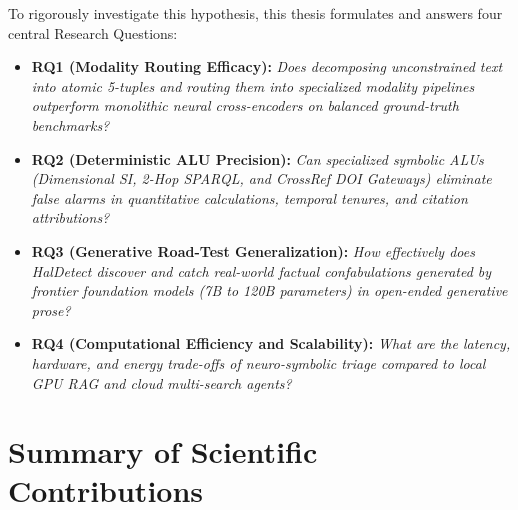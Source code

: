 To rigorously investigate this hypothesis, this thesis formulates and answers four central Research Questions:

\begin{itemize}
    \item \textbf{RQ1 (Modality Routing Efficacy):} \textit{Does decomposing unconstrained text into atomic 5-tuples and routing them into specialized modality pipelines outperform monolithic neural cross-encoders on balanced ground-truth benchmarks?}
    \item \textbf{RQ2 (Deterministic ALU Precision):} \textit{Can specialized symbolic ALUs (Dimensional SI, 2-Hop SPARQL, and CrossRef DOI Gateways) eliminate false alarms in quantitative calculations, temporal tenures, and citation attributions?}
    \item \textbf{RQ3 (Generative Road-Test Generalization):} \textit{How effectively does HalDetect discover and catch real-world factual confabulations generated by frontier foundation models (7B to 120B parameters) in open-ended generative prose?}
    \item \textbf{RQ4 (Computational Efficiency and Scalability):} \textit{What are the latency, hardware, and energy trade-offs of neuro-symbolic triage compared to local GPU RAG and cloud multi-search agents?}
\end{itemize}

\section{Summary of Scientific Contributions}
\label{sec:scientific_contributions}

